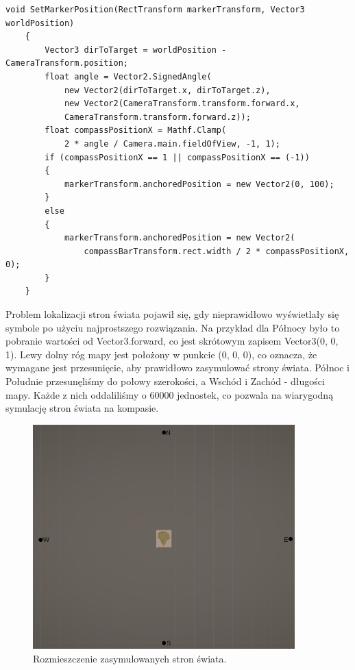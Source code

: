 \begin{minipage}{\textwidth}
    \begin{lstlisting}[caption=Fragment kodu odpowiedzialny za ustawienie symbolu na pasku kompasu]
    void SetMarkerPosition(RectTransform markerTransform, Vector3 worldPosition)
    {
        Vector3 dirToTarget = worldPosition - CameraTransform.position;
        float angle = Vector2.SignedAngle(
            new Vector2(dirToTarget.x, dirToTarget.z), 
            new Vector2(CameraTransform.transform.forward.x, 
            CameraTransform.transform.forward.z));
        float compassPositionX = Mathf.Clamp(
            2 * angle / Camera.main.fieldOfView, -1, 1);
        if (compassPositionX == 1 || compassPositionX == (-1))
        {
            markerTransform.anchoredPosition = new Vector2(0, 100);
        }
        else
        {
            markerTransform.anchoredPosition = new Vector2(
                compassBarTransform.rect.width / 2 * compassPositionX, 0);
        }
    }
    \end{lstlisting}
\end{minipage}

Problem lokalizacji stron świata pojawił się, gdy nieprawidłowo wyświetlały się symbole po użyciu najprostszego rozwiązania. Na przykład dla Północy było to pobranie wartości od Vector3.forward, co jest skrótowym zapisem Vector3(0, 0, 1). Lewy dolny róg mapy jest położony w punkcie (0, 0, 0), co oznacza, że wymagane jest przesunięcie, aby prawidłowo zasymulować strony świata. Północ i Południe przesunęliśmy do połowy szerokości, a Wschód i Zachód - długości mapy. Każde z nich oddaliliśmy o 60000 jednostek, co pozwala na wiarygodną symulację stron świata na kompasie.
\begin{figure}[htbp]
    \centering
    \includegraphics[width=0.9\textwidth]{images/ui/strony_swiata.png}
    \caption{Rozmieszczenie zasymulowanych stron świata.}\label{fig:world_sides}
\end{figure}

